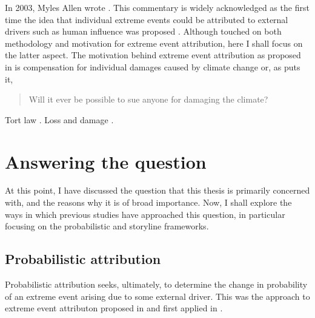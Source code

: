   In 2003, Myles Allen wrote  \citep{allen_liability_2003}. This commentary is widely acknowledged as the first time the idea that individual extreme events could be attributed to external drivers such as human influence was proposed \citep{otto_attribution_2017}. Although \citeauthor{allen_liability_2003} touched on both methodology and motivation for extreme event attribution, here I shall focus on the latter aspect. The motivation behind extreme event attribution as proposed in  is compensation for individual damages caused by climate change or, as \citeauthor{allen_liability_2003} puts it, 
  \begin{quote}
    Will it ever be possible to sue anyone for damaging the climate?
  \end{quote}
  Tort law \citep{allen_scientific_2007,lloyd_climate_2018,lloyd_environmental_2020,lloyd_climate_2021,lloyd_climate_2021-1,stuart-smith_filling_2021,stuart-smith_increased_2021,marjanac_acts_2017,marjanac_extreme_2018,burger_law_2020}. 
  Loss and damage \citep{clarke_inventories_2021,wehner_operational_2022}.

  \citep{ettinger_whats_2021,osaka_natural_2020,swain_attributing_2020}

  \citep{sillmann_understanding_2017}

\section{Answering the question}

  At this point, I have discussed the question that this thesis is primarily concerned with, and the reasons why it is of broad importance. Now, I shall explore the ways in which previous studies have approached this question, in particular focusing on the probabilistic \citep[often ``conventional'',][]{stott_human_2004} and storyline \citep{hoerling_anatomy_2013} frameworks. 

  \subsection{Probabilistic attribution}

    Probabilistic attribution seeks, ultimately, to determine the change in probability of an extreme event arising due to some external driver. This was the approach to extreme event attributon proposed in \citet{allen_liability_2003} and first applied in \citet{stott_human_2004}. 

